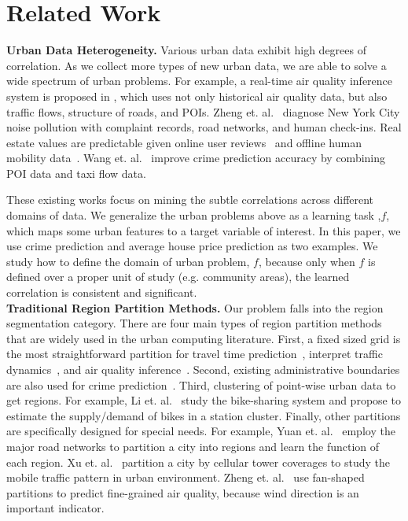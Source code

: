 \section{Related Work}
\label{ch4-sec:related-work}


\textbf{Urban Data Heterogeneity.} Various urban data exhibit high degrees of correlation. As we collect more types of new urban data, we are able to solve a wide spectrum of urban problems. For example, a real-time air quality inference system is proposed in \cite{zheng2013u}, which uses not only historical air quality data, but also traffic flows, structure of roads, and POIs. Zheng et. al.~\cite{zheng2014diagnosing} diagnose New York City noise pollution with complaint records, road networks, and human check-ins. Real estate values are predictable given online user reviews~\cite{fu2014sparse} and offline human mobility data~\cite{wang:region}. Wang et. al.~\cite{wang2016crime, wang2017non} improve crime prediction accuracy by combining POI data and taxi flow data.

These existing works focus on mining the subtle correlations across different domains of data. We generalize the urban problems above as a learning task ,$f$, which maps some urban features to a target variable of interest. In this paper, we use crime prediction and average house price prediction as two examples. We study how to define the domain of urban problem, $f$, because only when $f$ is defined over a proper unit of study (e.g. community areas), the learned correlation is consistent and significant. \\

\noindent\textbf{Traditional Region Partition Methods.} Our problem falls into the region segmentation category. There are four main types of region partition methods that are widely used in the urban computing literature. First, a fixed sized grid is the most straightforward partition for travel time prediction~\cite{wang2016simple}, interpret traffic dynamics~\cite{wu2016interpreting}, and air quality inference~\cite{zheng2013u}. Second, existing administrative boundaries are also used for crime prediction~\cite{wang2016crime}. Third, clustering of point-wise urban data to get regions. For example, Li et. al.~\cite{li2015traffic} study the bike-sharing system and propose to estimate the supply/demand of bikes in a station cluster. Finally, other partitions are specifically designed for special needs. For example, Yuan et. al.~\cite{yuan2012discovering} employ the major road networks to partition a city into regions and learn the function of each region. Xu et. al.~\cite{xu2017understanding} partition a city by cellular tower coverages to study the mobile traffic pattern in urban environment. Zheng et. al.~\cite{zheng2015forecasting} use fan-shaped partitions to predict fine-grained air quality, because wind direction is an important indicator.


